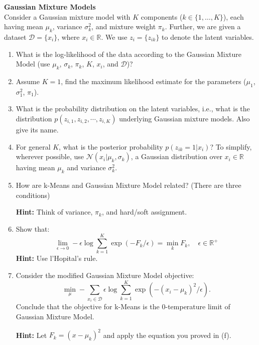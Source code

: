 \begin{Q}
\textbf{\Large Gaussian Mixture Models}\\

Consider a Gaussian mixture model with $K$ components ($k\in\{1, \ldots, K\}$), each having mean $\mu_k$, variance $\sigma_k^2$, and mixture weight $\pi_k$. Further, we are given a dataset $\mathcal{D} = \{x_i\}$, where $x_i \in \mathbb{R}$. We use $z_{i} = \{z_{ik}\}$ to denote the latent variables.


\begin{enumerate}

\item What is the log-likelihood of the data according to the Gaussian Mixture Model (use $\mu_k$, $\sigma_k$, $\pi_k$, $K$, $x_i$, and $\mathcal{D}$)?

\item Assume $K=1$,  find the maximum likelihood estimate for the parameters ($\mu_{1}$, $\sigma_{1}^{2}$, $\pi_{1}$).

\item What is the probability distribution on the latent variables, i.e., what is the distribution
$p(z_{i,1}, z_{i,2}, \cdots, z_{i,K} )$ underlying Gaussian mixture models. Also give its name.


\item For general $K$, what is the posterior probability $p(z_{ik} = 1|x_i)$? To simplify, wherever possible, use $\mathcal{N}(x_{i}|\mu_{k},\sigma_{k})$, a Gaussian distribution over $x_{i} \in \mathbb{R}$ having mean $\mu_{k}$ and variance $\sigma_{k}^2$.


\item  How are k-Means and Gaussian Mixture Model related? (There are three conditions)

\textbf{Hint:} Think of variance, $\pi_k$, and hard/soft assignment.

\item  Show that:
$$
\lim_{\epsilon \rightarrow 0} -\epsilon \log \sum_{k=1}^{K} \exp{(-F_{k}/\epsilon) } = \min_{k} F_{k}, \quad \epsilon \in \mathbb{R}^{+}
$$
\textbf{Hint:} Use l'Hopital's rule.

\item Consider the modified Gaussian Mixture Model objective:
$$
\min_{\mu} - \sum_{x_{i} \in \mathcal{D}} \epsilon \log \sum_{k=1}^{K} \exp{(-(x_{i} - \mu_{k} )^{2}/\epsilon) }.
$$
Conclude that the objective for k-Means is the 0-temperature limit of Gaussian Mixture Model.

\textbf{Hint:} Let $F_{k}= (x-\mu_{k})^{2}$ and apply the equation you proved in (f).


\end{enumerate}
\end{Q}
